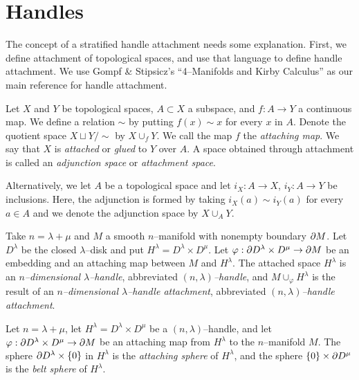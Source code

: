 \section{Handles}
\label{section:problem-handles}

The concept of a stratified handle attachment needs some explanation.
First, we define attachment of topological spaces, and use that language to define handle attachment.
We use Gompf \& Stipsicz's ``4--Manifolds and Kirby Calculus'' \cite{GompStip} as our main reference for handle attachment.

\begin{defn}[Attachment]
	Let $X$ and $Y$ be topological spaces, $A\subset X$ a subspace, and $f:A\to Y$ a continuous map.
	We define a relation $\sim$ by putting $f(x)\sim x$ for every $x$ in $A$.
	Denote the quotient space $X\sqcup Y/\sim$ by $X\cup_f Y$.
	We call the map $f$ the \emph{attaching map}.  
	We say that $X$ is \emph{attached} or \emph{glued} to $Y$ over $A$.
	A space obtained through attachment is called an \emph{adjunction space} or \emph{attachment space}.
	
	Alternatively, we let $A$ be a topological space and let $i_X:A\to X$, $i_Y:A\to Y$ be inclusions.
	Here, the adjunction is formed by taking $i_X(a)\sim i_Y(a)$ for every $a\in A$ and we denote the adjunction space by $X\cup_A Y$.
\end{defn}

\begin{defn}[Handle]
	\label{def:handle}
	Take $n=\lambda+\mu$ and $M$ a smooth $n$--manifold with nonempty boundary $\partial M$.
	Let $D^\lambda$ be the closed $\lambda$--disk and put $H^\lambda = D^\lambda\times D^\mu$.
	Let $\varphi:\partial D^\lambda\times D^\mu\to\partial M$ be an embedding and an attaching map between $M$ and $H^\lambda$.
	The attached space $H^\lambda$ is an \emph{$n$--dimensional $\lambda$--handle}, abbreviated \emph{$(n,\lambda)$--handle}, and $M\cup_\varphi H^\lambda$ is the result of an \emph{$n$--dimensional $\lambda$--handle attachment}, abbreviated \emph{$(n,\lambda)$--handle attachment}.

	Let $n=\lambda+\mu$, let $H^\lambda=D^\lambda\times D^\mu$ be a $(n,\lambda)$--handle, and let $\varphi:\partial D^\lambda\times D^\mu\to\partial M$ be an attaching map from $H^\lambda$ to the $n$--manifold $M$.
	The sphere $\partial D^\lambda\times \{0\}$ in $H^\lambda$ is the \emph{attaching sphere} of $H^\lambda$, and the sphere $\{0\}\times \partial D^\mu$ is the \emph{belt sphere} of $H^\lambda$.	
\end{defn}

